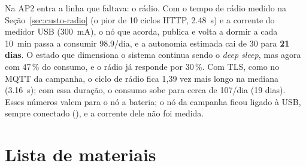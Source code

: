 Na AP2 entra a linha que faltava: o rádio. Com o tempo de rádio medido
na Seção~\ref{sec:custo-radio} (o pior de 10 ciclos HTTP,
\SI{2,48}{\second}) e a corrente do medidor USB
(\SI{300}{\milli\ampere}), o nó que acorda, publica e volta a dormir a
cada \SI{10}{\minute} passa a consumir \SI{98,9}{\mAh}/dia, e a
autonomia estimada cai de 30 para \textbf{21 dias}. O estado que
dimensiona o sistema continua sendo o \emph{deep sleep}, mas agora com
47\,\% do consumo, e o rádio já responde por 30\,\%. Com TLS, como no
MQTT da campanha, o ciclo de rádio fica 1,39 vez mais longo na mediana
(\SI{3,16}{\second}); com essa duração, o consumo sobe para cerca de
\SI{107}{\mAh}/dia (19 dias). Esses números
valem para o nó a bateria; o nó da campanha ficou ligado à USB, sempre
conectado (), e a corrente dele não foi medida.

\section{Lista de materiais}
\label{sec:bom}

